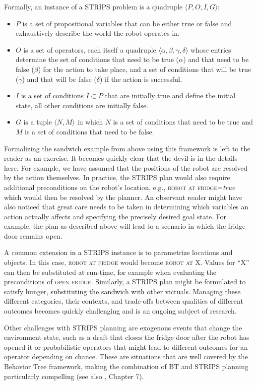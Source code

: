 Formally, an instance of a STRIPS problem is a quadruple $\langle P, O, I, G \rangle$:
\begin{itemize}
\item $P$ is a set of propositional variables that can be either true or false and exhaustively describe the world the robot operates in.
\item $O$ is a set of operators, each itself a quadruple $\langle \alpha, \beta, \gamma, \delta \rangle$ whose entries determine the set of conditions that need to be true ($\alpha$) and that need to be false ($\beta$) for the action to take place, and a set of conditions that will be true ($\gamma$) and that will be false ($\delta$) if the action is successful.
\item $I$ is a set of conditions $I \subset P$ that are initially true and define the initial state, all other conditions are initially false.
\item $G$ is a tuple $\langle N, M\rangle$ in which $N$ is a set of conditions that need to be true and $M$ is a set of conditions that need to be false.
\end{itemize}

Formalizing the sandwich example from above using this framework is left to the reader as an exercise. It becomes quickly clear that the devil is in the details here. For example, we have assumed that the positions of the robot are resolved by the action themselves. In practice, the STRIPS plan would also require additional preconditions on the robot's location, e.g., \textsc{robot at fridge}=\textsl{true} which would then be resolved by the planner. An observant reader might have also noticed that great care needs to be taken in determining which variables an action actually affects and specifying the precisely desired goal state. For example, the plan as described above will lead to a scenario in which the fridge door remains open.

A common extension in a STRIPS instance is to parametrize locations and objects. In this case, \textsc{robot at fridge} would become \textsc{robot at X}. Values for ``X'' can then be substituted at run-time, for example when evaluating the preconditions of \textsc{open fridge}. Similarly, a STRIPS plan might be formulated to satisfy hunger, substituting the sandwich with other victuals. Managing these different categories, their contexts, and trade-offs between qualities of different outcomes becomes quickly challenging and is an ongoing subject of research.

Other challenges with STRIPS planning are exogenous events that change the environment state, such as a draft that closes the fridge door after the robot has opened it or probabilistic operators that might lead to different outcomes for an operator depending on chance. These are situations that are well covered by the Behavior Tree framework, making the combination of BT and STRIPS planning particularly compelling (see also \cite{colledanchise2018behavior}, Chapter 7).

